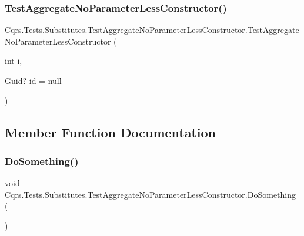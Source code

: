 \subsubsection{\texorpdfstring{Test\+Aggregate\+No\+Parameter\+Less\+Constructor()}{TestAggregateNoParameterLessConstructor()}}
{\footnotesize\ttfamily Cqrs.\+Tests.\+Substitutes.\+Test\+Aggregate\+No\+Parameter\+Less\+Constructor.\+Test\+Aggregate\+No\+Parameter\+Less\+Constructor (\begin{DoxyParamCaption}\item[{int}]{i,  }\item[{Guid?}]{id = {\ttfamily null} }\end{DoxyParamCaption})}



\subsection{Member Function Documentation}
\mbox{\label{classCqrs_1_1Tests_1_1Substitutes_1_1TestAggregateNoParameterLessConstructor_a5a5b9ab40339e27b2d3d0f08bfd24d0e}} 
\subsubsection{\texorpdfstring{Do\+Something()}{DoSomething()}}
{\footnotesize\ttfamily void Cqrs.\+Tests.\+Substitutes.\+Test\+Aggregate\+No\+Parameter\+Less\+Constructor.\+Do\+Something (\begin{DoxyParamCaption}{ }\end{DoxyParamCaption})}

